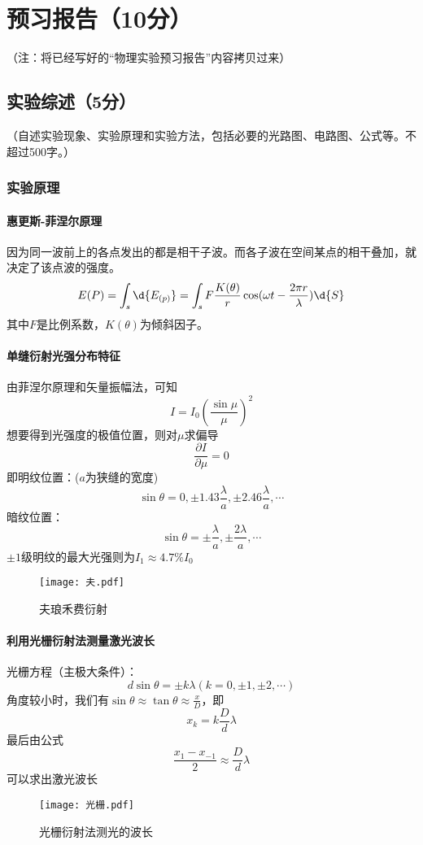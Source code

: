 \documentclass[]{../template/Report}%
\begin{document}
\maketitle%

\section{预习报告（10分）}
（注：将已经写好的“物理实验预习报告”内容拷贝过来）

\subsection{实验综述（5分）}
（自述实验现象、实验原理和实验方法，包括必要的光路图、电路图、公式等。不超过500字。）
\subsubsection{实验原理}
\paragraph{惠更斯-菲涅尔原理}
因为同一波前上的各点发出的都是相干子波。而各子波在空间某点的相干叠加，就决定了该点波的强度。
\[
E(P) = \int_s \d{E_{(p)}} = \int_s F\frac{K(\theta)}{r}\cos(\omega t - \frac{2 \pi r}{\lambda})\d{S}
\]
其中$F$是比例系数，$K(\theta)$为倾斜因子。
\paragraph{单缝衍射光强分布特征}
由菲涅尔原理和矢量振幅法，可知\[
I = I_0 (\frac{\sin \mu}{\mu})^2
\]
想要得到光强度的极值位置，则对$\mu$求偏导
\[
\frac{\partial I}{\partial \mu} = 0
\]
即明纹位置：($a$为狭缝的宽度)
\[
\sin\theta = 0, \pm 1.43\frac{\lambda}{a}, \pm 2.46\frac{\lambda}{a}, \cdots
\]
暗纹位置：
\[
\sin\theta = \pm \frac{\lambda}{a}, \pm \frac{2\lambda}{a}, \cdots
\]
$\pm 1$级明纹的最大光强则为$I_1 \approx 4.7\% I_0$

\begin{figure}[H]
    \centering
    \texttt{[image: 夫.pdf]}
    \caption{夫琅禾费衍射}
\end{figure}

\paragraph{利用光栅衍射法测量激光波长}
光栅方程（主极大条件）：
\[
d\sin \theta = \pm k\lambda(k = 0, \pm 1, \pm 2, \cdots)
\]
角度较小时，我们有$\sin\theta \approx \tan \theta \approx \frac{x}{D}$，即
\[
x_k = k\frac{D}{d}\lambda
\]
最后由公式\[\frac{x_1 - x_{-1}}{2} \approx \frac{D}{d}\lambda\]
可以求出激光波长
\begin{figure}[H]
    \centering
    \texttt{[image: 光栅.pdf]}
    \caption{光栅衍射法测光的波长}
\end{figure}
\end{document}
